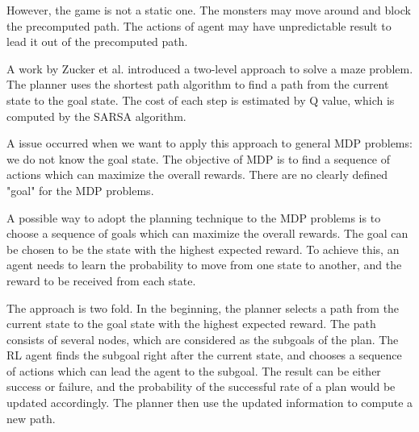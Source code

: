 However, the game is not a static one. The monsters may move around and block the precomputed path. The actions of
agent may have unpredictable result to lead it out of the precomputed path.

A work by Zucker et al. \cite{Planner} introduced a two-level approach to solve a maze problem.
The planner uses the shortest path algorithm to find a path from the current state to the goal state.
The cost of each step is estimated by Q value, which is computed by the SARSA algorithm.

A issue occurred when we want to apply this approach to general MDP problems: we do not know the 
goal state. The objective of MDP is to find a sequence of actions which can maximize the overall 
rewards. There are no clearly defined "goal" for the MDP problems.

A possible way to adopt the planning technique to the MDP problems is to choose a sequence 
of goals which can maximize the overall rewards. The goal can be chosen to be the state
with the highest expected reward. To achieve this, an agent needs to learn 
the probability to move from one state to another, and the reward to be received
from each state. 

The approach is two fold. In the beginning, the planner selects a path from the current 
state to the goal state with the highest expected reward. The path consists of several
nodes, which are considered as the subgoals of the plan. The RL agent finds the subgoal 
right after the current state, and chooses a sequence of actions which can lead the agent
to the subgoal. The result can be either success or failure, and the probability of the successful
rate of a plan would be updated accordingly. The planner then use the updated information to 
compute a new path.

